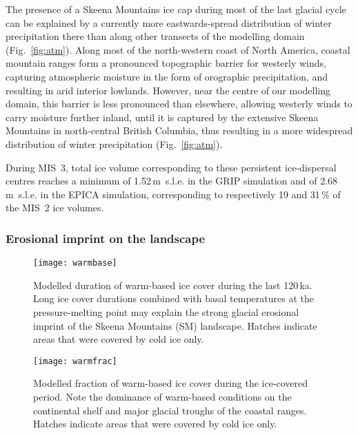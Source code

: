 \documentclass[tc]{copernicus}
\begin{document}
The presence of a Skeena Mountains ice cap during most of the last glacial
cycle can be explained by a currently more eastwards-spread distribution of
winter precipitation there than along other transects of the
modelling domain (Fig.~\ref{fig:atm}). Along most of the north-western coast of
North America, coastal mountain ranges form a pronounced topographic barrier
for westerly winds, capturing atmospheric moisture in the form of orographic
precipitation, and resulting in arid interior lowlands. However, near the
centre of our modelling domain, this barrier is less pronounced than elsewhere,
allowing westerly winds to carry moisture
further inland, until it is captured by the extensive Skeena Mountains in
north-central British Columbia, thus resulting in a more widespread
distribution of winter precipitation (Fig.~\ref{fig:atm}).

During MIS~3, total ice volume corresponding to these persistent ice-dispersal
centres reaches a minimum of 1.52\,m~s.l.e. in the GRIP simulation and of
2.68\,m~s.l.e. in the EPICA simulation, corresponding to respectively 19 and
31\,\% of the MIS~2 ice volumes.

\subsubsection{Erosional imprint on the landscape}

\begin{figure*}
  \texttt{[image: warmbase]}
  \caption{Modelled duration of warm-based ice cover during the last
           120\,ka. Long ice cover durations combined with basal
           temperatures at the pressure-melting point may explain the strong
           glacial erosional imprint of the Skeena Mountains (SM) landscape.
           Hatches indicate areas that were covered by cold ice only.}
  \label{fig:warmbase}
\end{figure*}

\begin{figure*}
  \vspace{-0.5mm}  %
  \texttt{[image: warmfrac]}
  \caption{Modelled fraction of warm-based ice cover during the ice-covered
           period. Note the dominance of warm-based conditions on the
           continental shelf and major glacial troughs of the coastal ranges.
           Hatches indicate areas that were covered by cold ice only.}
  \label{fig:warmfrac}
\end{figure*}
\end{document}
